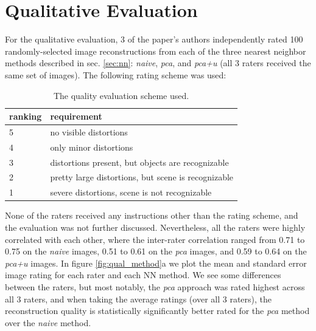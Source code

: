 
\section{Qualitative Evaluation}\label{sec:qual}

For the qualitative evaluation, 3 of the paper's authors independently rated 100 randomly-selected image reconstructions from each of the three nearest neighbor methods described in sec. \ref{sec:nn}: \emph{naive}, \emph{pca}, and \emph{pca+u} (all 3 raters received the same set of images). The following rating scheme was used:

\begin{table}
\begin{tabular}{| l | l|}
 \hline
\textbf{ranking} & \textbf{requirement}  \\ \hline
5 & no visible distortions \\ \hline
4 & only minor distortions \\ \hline
3 & distortions present, but objects are recognizable  \\ \hline
2 & pretty large distortions, but scene is recognizable  \\ \hline
1 & severe distortions, scene is not recognizable  \\ \hline
\end{tabular}
\caption{The quality evaluation scheme used.}
\label{tb:rankings}
\end{table}

None of the raters received any instructions other than the rating scheme, and the evaluation was not further discussed. Nevertheless, all the raters were highly correlated with each other, where the inter-rater correlation ranged from 0.71 to 0.75 on the \emph{naive} images, 0.51 to 0.61 on the \emph{pca} images, and 0.59 to 0.64 on the \emph{pca+u} images. In figure \ref{fig:qual_method}a we plot the mean and standard error image rating for each rater and each NN method. We see some differences between the raters, but most notably, the \emph{pca} approach was rated highest across all 3 raters, and when taking the average ratings (over all 3 raters), the reconstruction quality is statistically significantly better rated for the \emph{pca} method over the \emph{naive} method. 

